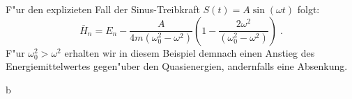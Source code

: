     F"ur den explizieten Fall der Sinus-Treibkraft $S(t)=A\sin(\omega t)$ folgt:
    \begin{equation}
      \bar H_n = E_n - \frac{A}{4m(\omega_0^2-\omega^2)}\left(1-\frac{2\omega^2}{(\omega_0^2-\omega^2)}\right) \; .
    \end{equation}
    F"ur $\omega_0^2>\omega^2$ erhalten wir in diesem Beispiel demnach einen Anstieg des Energiemittelwertes gegen"uber den Quasienergien, andernfalls eine Absenkung.























































   b
